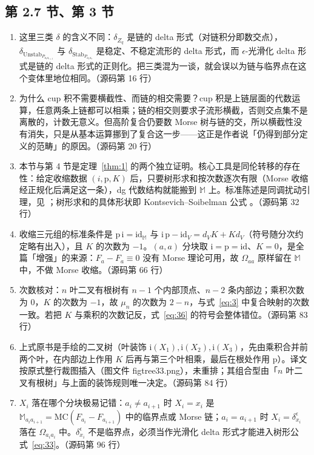 \subsection*{第 2.7 节、第 3 节}
\begin{enumerate}
  \item 这里三类 $\delta$ 的含义不同：$\delta_{Z_q}$ 是链的 delta 形式（对链积分即数交点），$\delta_{\mathrm{Unstab}_{P_{a_ia_{i+1}}}}$ 与 $\delta_{\mathrm{Stab}_{P_{a_1a_r}}}$ 是稳定、不稳定流形的 delta 形式，而 $\epsilon$-光滑化 delta 形式是链的 delta 形式的正则化。把三类混为一谈，就会误以为链与临界点在这个变体里地位相同。\hfill{\footnotesize （源码第 16 行）}
  \item 为什么 cup 积不需要横截性、而链的相交需要？cup 积是上链层面的代数运算，任意两条上链都可以相乘；链的相交则要求子流形横截，否则交点集不是离散的，计数无意义。但高阶复合仍要数 Morse 树与链的交，所以横截性没有消失，只是从基本运算挪到了复合这一步——这正是作者说「仍得到部分定义的范畴」的原因。\hfill{\footnotesize （源码第 20 行）}
  \item 本节与第 4 节是定理~\ref{thm:1} 的两个独立证明。核心工具是同伦转移的存在性：给定收缩数据 $(i,\mathrm{p},K)$ 后，只要树形求和按次数逐次有限（Morse 收缩经正规化后满足这一条），dg 代数结构就能搬到 $\mathbb{M}$ 上。标准陈述是同调扰动引理，见 \cite{crainic,gugenheim,lambe}；树形求和的具体形状即 Kontsevich--Soibelman 公式 \cite{kontsevichsoibelman}。\hfill{\footnotesize （源码第 32 行）}
  \item 收缩三元组的标准条件是 $\mathrm{p}\,\mathrm{i}=\mathrm{id}_{\mathbb{M}}$ 与 $\mathrm{i}\,\mathrm{p}-\mathrm{id}_V=d_VK+Kd_V$（符号随分次约定略有出入），且 $K$ 的次数为 $-1$。$(a,a)$ 分块取 $\mathrm{i}=\mathrm{p}=\mathrm{id}$、$K=0$，是全篇「增强」的来源：$F_a-F_a\equiv0$ 没有 Morse 理论可用，故 $\Omega_{aa}$ 原样留在 $\mathbb{M}$ 中，不做 Morse 收缩。\hfill{\footnotesize （源码第 66 行）}
  \item 次数核对：$n$ 叶二叉有根树有 $n-1$ 个内部顶点、$n-2$ 条内部边；乘积次数为 $0$，$K$ 的次数为 $-1$，故 $\mu_n$ 的次数为 $2-n$，与式~\eqref{eq:3} 中复合映射的次数一致。若把 $K$ 与乘积的次数记反，式~\eqref{eq:36} 的符号会整体错位。\hfill{\footnotesize （源码第 83 行）}
  \item 上式原书是手绘的二叉树（叶装饰 $\mathrm{i}(X_1),\mathrm{i}(X_2),\mathrm{i}(X_3)$，先由乘积合并前两个叶，在内部边上作用 $K$ 后再与第三个叶相乘，最后在根处作用 $\mathrm{p}$）。译文按原式整行裁图插入（图文件 \mbox{figtree33.png}），未重排；其组合型由「$n$ 叶二叉有根树」与上面的装饰规则唯一决定。\hfill{\footnotesize （源码第 84 行）}
  \item $X_i$ 落在哪个分块极易记错：$a_i\neq a_{i+1}$ 时 $X_i=x_i$ 是 $\mathbb{M}_{a_ia_{i+1}}=\mathrm{MC}(F_{a_i}-F_{a_{i+1}})$ 中的临界点或 Morse 链；$a_i=a_{i+1}$ 时 $X_i=\delta^{\epsilon}_{x_i}$ 落在 $\Omega_{a_ia_i}$ 中。$\delta^{\epsilon}_{x_i}$ 不是临界点，必须当作光滑化 delta 形式才能进入树形公式~\eqref{eq:33}。\hfill{\footnotesize （源码第 96 行）}

\end{enumerate}
